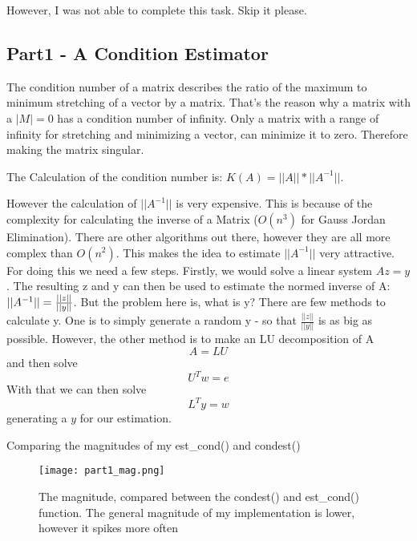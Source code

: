 \documentclass{article}
\begin{document}
However, I was not able to complete this task. Skip it please.
\par\noindent

\subsection{Part1 - A Condition Estimator}
The condition number of a matrix describes the ratio of the maximum to minimum stretching of a vector by a matrix. That's the reason why a matrix with a \(|M| = 0\)  has a condition number of infinity.
Only a matrix with a range of infinity for stretching and minimizing a vector, can minimize it to zero. Therefore making the matrix singular.
\par\noindent
The Calculation of the condition number is:
\(K(A) = ||A|| * ||A^{-1}||\).
\par\noindent
However the calculation of \(||A^{-1}||\) is very expensive. This is because of the complexity for calculating the inverse of a Matrix ($O(n^3)$ for Gauss Jordan Elimination).
There are other algorithms out there, however they are all more complex than $O(n^2)$.
This makes the idea to estimate  \(||A^{-1}||\) very attractive. For doing this we need a few steps.
Firstly, we would solve a linear system \(A z = y\).
The resulting z and y can then be used to estimate the normed inverse of A: \(\\||A^{-1}|| = \frac{||z||}{||y||}\).
But the problem here is, what is y? 
There are few methods to calculate y. One is to simply generate a random y - so that \(\frac{||z||}{||y||}\) is as big as possible.
However, the other method is to make an LU decomposition of A 
\begin{equation}
    A = L U
\end{equation}
and then solve 
\begin{equation}
    U^T w = e
\end{equation}
With that we can then solve 
\begin{equation}
    L^T y = w
\end{equation}
generating a \(y\) for our estimation.

Comparing the magnitudes of my est\_cond() and condest()
\begin{figure}
    \centering
    \texttt{[image: part1\_mag.png]}
    \caption{The magnitude, compared between the condest() and est\_cond() function. The general magnitude of my implementation is lower, however it spikes more often }
    \label{fig:part1}
\end{figure}
\end{document}
